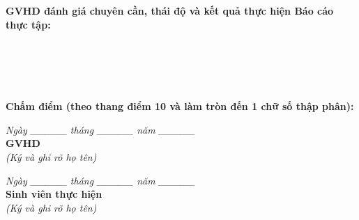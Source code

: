 ﻿\documentclass[13pt, a4paper]{article}
\begin{document}
\vspace{0.5cm}
\noindent \textbf{GVHD đánh giá chuyên cần, thái độ và kết quả thực hiện Báo cáo thực tập:}\\
\dotfill\\
\dotfill\\
\dotfill\\
\dotfill\\
\dotfill\\
\textbf{Chấm điểm (theo thang điểm 10 và làm tròn đến 1 chữ số thập phân):} \dotfill

\vspace{0.5cm}
\noindent
\begin{minipage}[t]{0.5\textwidth}
\begin{center}
\textit{Ngày \_\_\_\_\_ tháng \_\_\_\_\_ năm \_\_\_\_\_}\\
\textbf{GVHD}\\
\textit{(Ký và ghi rõ họ tên)}
\end{center}
\end{minipage}%
\begin{minipage}[t]{0.5\textwidth}
\begin{center}
\textit{Ngày \_\_\_\_\_ tháng \_\_\_\_\_ năm \_\_\_\_\_}\\
\textbf{Sinh viên thực hiện}\\
\textit{(Ký và ghi rõ họ tên)}
\end{center}
\end{minipage}
\end{document}
